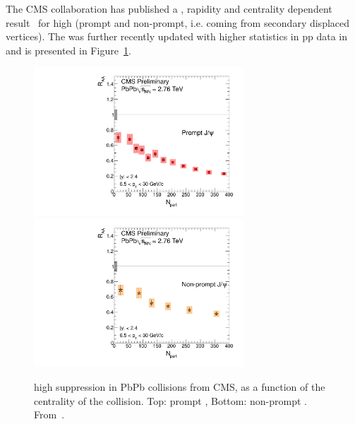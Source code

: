 The CMS collaboration has published a \pt, rapidity and centrality dependent \Jpsi
result~\cite{torsten} for high \pt \Jpsi (prompt and non-prompt,
i.e. coming from secondary displaced vertices). The \RAA was further
 recently updated with higher statistics in pp data in~\cite{12014} and is
presented in Figure~\ref{fig:CMSpsi}.
\begin{figure}[h]
\begin{center}
  \includegraphics[width=0.7\textwidth]{Chapters/pQuarkonia/CMSPromptJpsi.pdf}
  \includegraphics[width=0.7\textwidth]{Chapters/pQuarkonia/CMSNonPromptJpsi.pdf}
  \caption{high \pt \Jpsi suppression in PbPb collisions from CMS, as a function of
    the centrality of the collision. Top: prompt \Jpsi, Bottom:
    non-prompt \Jpsi. From~\cite{12014}.}
  \label{fig:CMSpsi}
\end{center}
\end{figure}



